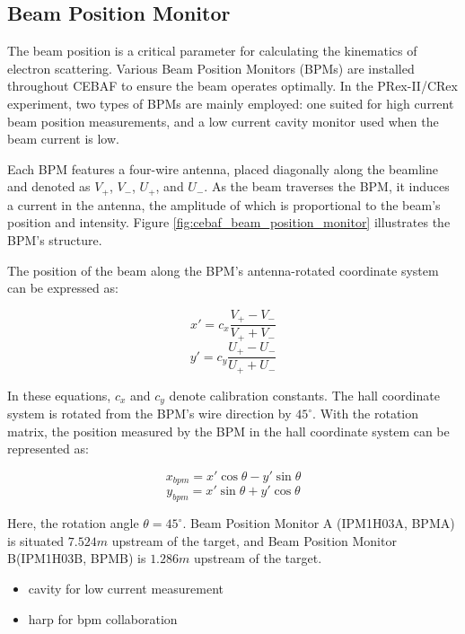 \subsection{Beam Position Monitor}

The beam position is a critical parameter for calculating the kinematics of electron scattering. Various Beam Position Monitors (BPMs) are installed throughout CEBAF to ensure the beam operates optimally. In the PRex-II/CRex experiment, two types of BPMs are mainly employed: one suited for high current beam position measurements, and a low current cavity monitor used when the beam current is low.

Each BPM features a four-wire antenna, placed diagonally along the beamline and denoted as $V_+$, $V_-$, $U_+$, and $U_-$. As the beam traverses the BPM, it induces a current in the antenna, the amplitude of which is proportional to the beam's position and intensity. Figure \ref{fig:cebaf_beam_position_monitor} illustrates the BPM's structure.

The position of the beam along the BPM's antenna-rotated coordinate system can be expressed as:

\begin{equation}
x' = c_x\frac{V_+ - V_-}{V_+ + V_-}
\end{equation}
\begin{equation}
y' = c_y\frac{U_+ - U_-}{U_+ + U_-}
\end{equation}

In these equations, $c_x$ and $c_y$ denote calibration constants. The hall coordinate system is rotated from the BPM's wire direction by $45^\circ$. With the rotation matrix, the position measured by the BPM in the hall coordinate system can be represented as:

\begin{equation}
x_{bpm} = x'\cos{\theta} - y'\sin{\theta}
\end{equation}
\begin{equation}
y_{bpm} = x'\sin{\theta} + y'\cos{\theta}
\end{equation}

Here, the rotation angle $\theta = 45^\circ$. Beam Position Monitor A (IPM1H03A, BPMA) is situated $7.524m$ upstream of the target, and Beam Position Monitor B(IPM1H03B, BPMB) is $1.286m$ upstream of the target.



\begin{itemize}
    \item cavity for low current measurement 
    \item harp for bpm collaboration
\end{itemize}

